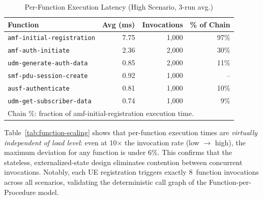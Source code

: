 \documentclass[conference]{IEEEtran}
\begin{document}
\begin{table}[t]
\centering
\caption{Per-Function Execution Latency (High Scenario, 3-run avg.)}
\label{tab:function-latency}
\footnotesize
\begin{tabular}{@{}lrrr@{}}
\toprule
\textbf{Function} & \textbf{Avg (ms)} & \textbf{Invocations} & \textbf{\% of Chain} \\
\midrule
\texttt{amf-initial-registration} & 7.75 & 1{,}000 & 97\% \\
\texttt{amf-auth-initiate}        & 2.36 & 2{,}000 & 30\% \\
\texttt{udm-generate-auth-data}   & 0.85 & 2{,}000 &  11\% \\
\texttt{smf-pdu-session-create}   & 0.92 & 1{,}000 & -- \\
\texttt{ausf-authenticate}        & 0.81 & 1{,}000 & 10\% \\
\texttt{udm-get-subscriber-data}  & 0.74 & 1{,}000 &  9\% \\
\bottomrule
\multicolumn{4}{l}{\scriptsize Chain \%: fraction of amf-initial-registration execution time.}
\end{tabular}
\end{table}

Table~\ref{tab:function-scaling} shows that per-function execution times are \emph{virtually independent of load level}: even at 10$\times$ the invocation rate (low $\to$ high), the maximum deviation for any function is under 6\%. This confirms that the stateless, externalized-state design eliminates contention between concurrent invocations. Notably, each UE registration triggers exactly 8~function invocations across all scenarios, validating the deterministic call graph of the Function-per-Procedure model.

\begin{table}[t]
\centering
\caption{Function Execution Time Across Load Levels (ms)}
\label{tab:function-scaling}
\footnotesize
{}
\end{table}
\end{document}
